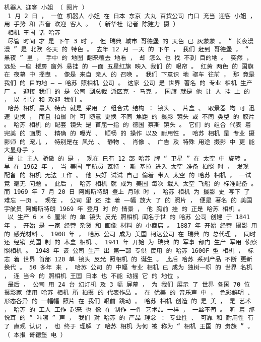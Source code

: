 \documentclass{article}
\begin{document}
\begin{Verbatim}[commandchars=\\\{\}]
 机器人 迎客 小姐 （ 图片 ） 
 1 月 2 日 ， 一位 机器人 小姐 在 日本 东京 大丸 百货公司 门口 充当 迎客 小姐 ， 用 手势 和 声音 欢迎 客人 。 （ 新华社 记者 陈建力 摄 ） 
 相机 王国 话 哈苏 
 尽管 时间 才 是 下午 3 时 ， 但 瑞典 城市 哥德堡 的 天色 已 灰蒙蒙 。 “ 长夜漫漫 ” 是 北欧 冬天 的 特色 。 去年 12 月 一天 的 下午 ， 我们 赶到 哥德堡 ， “ 黑夜 ” 里 ， 手中 的 地图 翻来覆去 地看 ， 却 怎么 也 找 不到 目的地 。 突然 ， 远处 一座 楼房 窗外 悬挂 的 一面 五星红旗 映入 我们 的 眼帘 。 红黄 两色 的 国旗 在 夜幕 中 摇曳 ， 像是 来自 亲人 的 召唤 。 我们 下意识 地 驱车 往前 ， 那 竟是 我们 的 目的地 — — 哈苏 照相机 公司 。 这家 公司 是 世界 著名 的 专业 相机 生产厂 。 迎接 我们 的 是 公司 副总裁 派区克 · 马克 。 国旗 就是 他 让 人 挂 上 的 ， 以 引导 和 欢迎 我们 。 
 哈苏 相机 最大 特点 就是 采用 了 组合式 结构 ： 镜头 、 片盒 、 取景器 均 可 迅速 更换 ， 而且 拍摄 时 可 随意 更换 不同 焦距 的 摄影 镜头 或 不同 类型 的 胶片 。 哈苏 相机 的 配套 镜头 是 首屈一指 的 德国 蔡斯 镜头 。 它们 的 组合 代表 着 完美 的 画质 、 精确 的 曝光 、 顺畅 的 操作 以及 耐用性 。 哈苏 相机 是 专业 摄影师 的 宠儿 ， 特别是在 风光 、 静物 、 肖像 、 广告 及 特殊 用途 摄影 中 更 能 大显身手 。 
 最 让 主人 骄傲 的 是 ， 现在 已有 12 部 哈苏 牌 “ 卫星 ” 在 太空 中 旋转 。 早 在 1962 年 ， 当 美国 宇航员 瓦特 · 斯 基拉 进入 太空 准备 拍照 时 ， 发现 配备 的 相机 无法 工作 。 他 只好 试试 自己 偷着 带入 太空 的 哈苏 相机 ， 一试 竟 毫无 问题 。 此后 ， 哈苏 相机 就 成为 美国 每次 载人 太空 飞船 的 标准配备 。 而 1969 年 7 月 20 日 阿姆斯特朗 登上 月球 时 ， 哈苏 相机 为 摄影 史 写下 了 难忘 一页 。 现在 ， 公司 里 还 挂 着 一幅 放大 了 的 照片 ， 便是 著名 的 美国 宇航员 阿姆斯特朗 1969 年 登月 时 的 情景 ， 他 胸前 挂 的 正是 哈苏 相机 。 
 以 生产 6 × 6 厘米 的 单 镜头 反光 照相机 闻名于世 的 哈苏 公司 创建 于 1841 年 ， 开始 是 一家 经营 杂货 和 画像 材料 的 小商店 。 1887 年 开始 经营 摄影 用 的 感光材料 。 1908 年 ， 哈苏 公司 成为 美国 柯达公司 在 瑞典 的 总代理 ， 同时 还 经销 英国 制 的 木盒 相机 。 1941 年 开始 为 瑞典 的 军事 部门 生产 军用 侦察 照相机 。 1948 年 该 公司 生产 出 第一部 专供 民用 的 哈苏 1600F 型 相机 ， 标志 着 世界 首部 120 单 镜头 反光 照相机 的 诞生 。 此后 哈苏 系列产品 不断 更新换代 。 50 多年 来 ， 哈苏 公司 的 中幅 专业 相机 已 成为 独树一帜 的 世界 名机 ， 连 当今 的 照相机 王国 日本 也 不能 动摇 它 的 地位 。 
 最后 ， 公司 用 24 台 幻灯机 及 3 幅 屏幕 ， 为 我们 展示 了 世界 各国 70 位 摄影家 使用 哈苏 相机 所 拍摄 的 代表作品 。 在 优美 的 音乐声 中 ， 色彩鲜明 、 形态各异 的 一幅幅 照片 在 我们 眼前 跳动 。 哈苏 相机 创造 的 是 美 ， 是 艺术 ， 哈苏 的 工人 工作 起来 也 像 在 制作 一件 艺术品 一样 ， 一丝不苟 。 听 着 那 悦耳 的 “ 咔嚓 ” 声 ， 我们 对 哈苏 的 产品 理念 ： 专业性 、 可靠 和 耐用性 有 了 直观 认识 ， 也 终于 理解 了 哈苏 相机 为何 被 称为 “ 相机 王国 的 贵族 ” 。 （ 本报 哥德堡 电 ） 

\end{Verbatim}
\end{document}

